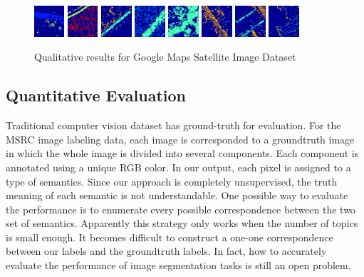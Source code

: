 \documentclass{acm_proc_article-sp}
\begin{document}
\begin{figure}
 \includegraphics[width=0.1\textwidth]{fig/gmaps/720g}
 \includegraphics[width=0.1\textwidth]{fig/gmaps/978g}
 \includegraphics[width=0.1\textwidth]{fig/gmaps/1307g}
 \includegraphics[width=0.1\textwidth]{fig/gmaps/5474g}
 \includegraphics[width=0.1\textwidth]{fig/gmaps/8436g}
 \includegraphics[width=0.1\textwidth]{fig/gmaps/12338g}
 \includegraphics[width=0.1\textwidth]{fig/gmaps/12396g}
 \includegraphics[width=0.1\textwidth]{fig/gmaps/14811g}
 \caption{Qualitative results for Google Maps Satellite Image Dataset}
\end{figure}


\subsection{Quantitative Evaluation}
Traditional computer vision dataset has ground-truth for evaluation. For the MSRC image labeling data, each image is corresponded to a groundtruth image in which the whole image is divided into several components. Each component is annotated using a unique RGB color. In our output, each pixel is assigned to a type of semantics. Since our approach is completely unsupervised, the truth meaning of each semantic is not understandable. One possible way to evaluate the performance is to enumerate every possible correspondence between the two set of semantics. Apparently this strategy only works when the number of topics is small enough. It becomes difficult to construct a one-one correspondence between our labels and the groundtruth labels. In fact, how to accurately evaluate the performance of image segmentation tasks is still an open problem.
\end{document}
